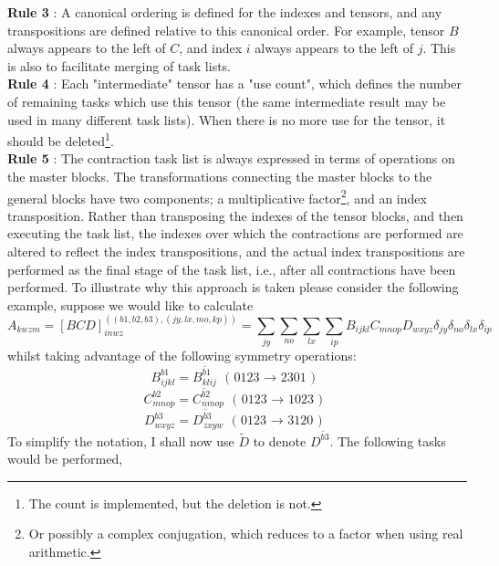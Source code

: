 \noindent \textbf{Rule 3} : A canonical ordering is defined for the indexes and tensors, and
any transpositions are defined relative to this canonical order. For example, tensor
$B$ always appears to the left of $C$, and index $i$ always appears to the left
of $j$. This is also to facilitate merging of task lists.\\

\noindent \textbf{Rule 4} : Each "intermediate" tensor has a
"use count", which defines the number of remaining tasks which use this tensor (the
same intermediate result may be used in many different task lists). When there is 
no more use for the tensor, it should be deleted\footnote{The count is
implemented, but the deletion is not.}.\\

\noindent \textbf{Rule 5} : The contraction task list is always expressed in terms
of operations on the master blocks.  The
transformations connecting the master blocks to the general blocks have two
components; a multiplicative factor\footnote{Or possibly a complex conjugation,
which reduces to a factor when using real arithmetic.}, and an index
transposition.  Rather than transposing the indexes of the tensor blocks, and
then executing the task list, the indexes over which the contractions are
performed are altered to reflect the index transpositions, and the actual
index transpositions are performed as the final stage of the task list, i.e.,
after all contractions have been performed. To illustrate why
this approach is taken please consider the following example, suppose we would
like to calculate
\begin{equation}
A_{kwzm} = 
[BCD]^{((b1,b2,b3),(jy,lx,mo,kp))}_{inwz} = \sum_{jy}\sum_{no}\sum_{lx}\sum_{ip} B_{ijkl}C_{mnop}D_{wxyz} \delta_{jy} \delta_{no} \delta_{lx}\delta_{ip}
\end{equation}
whilst taking advantage of the following symmetry operations:
\begin{equation*}
B_{ijkl}^{b1} = B_{klij}^{\tilde{b1}}  \text{ \ \ ( 0123 $\rightarrow$ 2301 ) }
\end{equation*}
\begin{equation*}
C_{mnop}^{b2} = C_{nmop}^{\tilde{b2}}  \text{ \ \ ( 0123 $\rightarrow$ 1023 ) }
\end{equation*}
\begin{equation*}
D_{wxyz}^{b3} = D_{zxyw}^{\tilde{b3}}  \text{ \ \ ( 0123 $\rightarrow$ 3120 ) }
\end{equation*}
To simplify the notation, I shall now use $\tilde{D}$ to denote $D^{\tilde{b3}}$. The following tasks would be performed,
